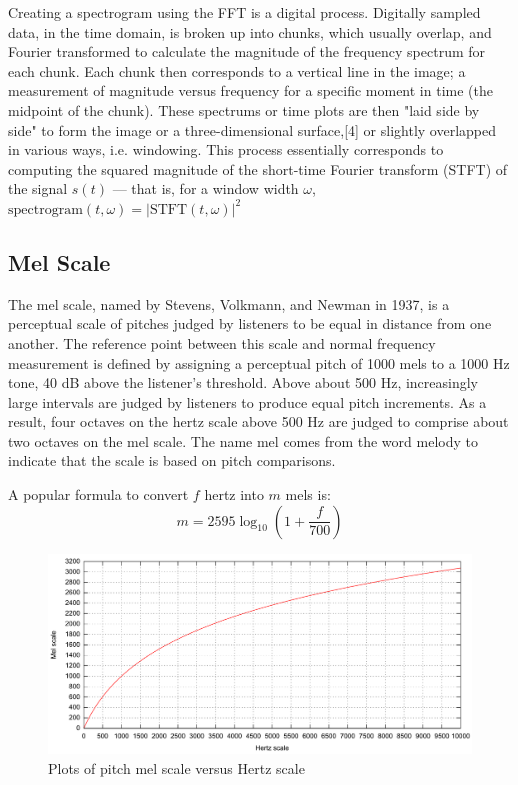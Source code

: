 \documentclass[journal, a4paper]{IEEEtran}
\begin{document}
Creating a spectrogram using the FFT is a digital process. Digitally sampled data, in the time domain, is broken up into chunks, which usually overlap, and Fourier transformed to calculate the magnitude of the frequency spectrum for each chunk. Each chunk then corresponds to a vertical line in the image; a measurement of magnitude versus frequency for a specific moment in time (the midpoint of the chunk). These spectrums or time plots are then "laid side by side" to form the image or a three-dimensional surface,[4] or slightly overlapped in various ways, i.e. windowing. This process essentially corresponds to computing the squared magnitude of the short-time Fourier transform (STFT) of the signal $s(t)$ — that is, for a window width $\omega$, $\mathrm{spectrogram}(t,\omega)=\left|\mathrm {STFT} (t,\omega )\right|^{2}$

\subsection{Mel Scale}

The mel scale, named by Stevens, Volkmann, and Newman in 1937, is a perceptual scale of pitches judged by listeners to be equal in distance from one another. The reference point between this scale and normal frequency measurement is defined by assigning a perceptual pitch of 1000 mels to a 1000 Hz tone, 40 dB above the listener's threshold. Above about 500 Hz, increasingly large intervals are judged by listeners to produce equal pitch increments. As a result, four octaves on the hertz scale above 500 Hz are judged to comprise about two octaves on the mel scale. The name mel comes from the word melody to indicate that the scale is based on pitch comparisons.

A popular formula to convert $f$ hertz into $m$ mels is:
\begin{equation}
    m=2595\log _{10}\left(1+{\frac {f}{700}}\right)
\end{equation}

\begin{figure}[htb]
    \includegraphics[width=\linewidth]{figures/Mel-Hz_plot.pdf}
    \caption{Plots of pitch mel scale versus Hertz scale}
\end{figure}
\end{document}
